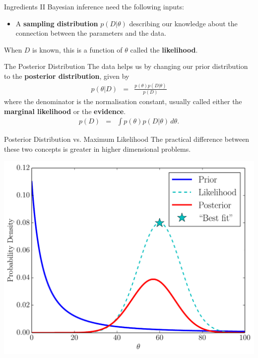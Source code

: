 \documentclass{beamer}
\begin{document}
\begin{frame}[t]{Ingredients II}
Bayesian inference need the following inputs:
\begin{itemize}
\item A {\bf sampling distribution} $p(D | \theta)$ describing our knowledge
about the connection between the parameters and the data.
\end{itemize}

When $D$ is known,
this is a function of $\theta$ called the {\bf likelihood}.
\end{frame}


\begin{frame}[t]{The Posterior Distribution}
The data helps us by changing our prior distribution to the {\bf posterior
distribution}, given by
\begin{eqnarray*}
p(\theta | D) &=& \frac{p(\theta) p(D|\theta)}{p(D)}
\end{eqnarray*}
where the denominator is the normalisation constant, usually called either
the {\bf marginal likelihood} or the {\bf evidence}.
\begin{eqnarray*}
p(D) &=& \int p(\theta)p(D|\theta) \, d\theta.
\end{eqnarray*}

\end{frame}

\begin{frame}[t]{Posterior Distribution vs. Maximum Likelihood}
The practical difference between these two concepts is greater in higher
dimensional problems.
\begin{center}
\includegraphics[scale=0.35]{figures/bayes.pdf}
\end{center}
\end{frame}
\end{document}

